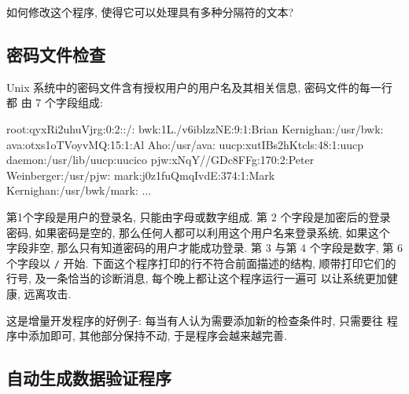 \begin{exercise}
    如何修改这个程序, 使得它可以处理具有多种分隔符的文本?
\end{exercise}

\subsection{密码文件检查}
\label{subsec:password_file checking}

Unix 系统中的密码文件含有授权用户的用户名及其相关信息, 密码文件的每一行都
由 7 个字段组成:
\begin{awkcode}
    root:qyxRi2uhuVjrg:0:2::/:
    bwk:1L./v6iblzzNE:9:1:Brian Kernighan:/usr/bwk:
    ava:otxs1oTVoyvMQ:15:1:Al Aho:/usr/ava:
    uucp:xutIBs2hKtcls:48:1:uucp daemon:/usr/lib/uucp:uucico
    pjw:xNqY//GDc8FFg:170:2:Peter Weinberger:/usr/pjw:
    mark:j0z1fuQmqIvdE:374:1:Mark Kernighan:/usr/bwk/mark:
    ...
\end{awkcode}
第1个字段是用户的登录名, 只能由字母或数字组成. 第 2 个字段是加密后的登录
密码, 如果密码是空的, 那么任何人都可以利用这个用户名来登录系统, 如果这个
字段非空, 那么只有知道密码的用户才能成功登录. 第 3 与第 4 个字段是数字,
第 6 个字段以 \verb'/' 开始. 下面这个程序打印的行不符合前面描述的结构,
顺带打印它们的行号, 及一条恰当的诊断消息, 每个晚上都让这个程序运行一遍可
以让系统更加健康, 远离攻击.

这是增量开发程序的好例子: 每当有人认为需要添加新的检查条件时, 只需要往
程序中添加即可, 其他部分保持不动, 于是程序会越来越完善.

\subsection{自动生成数据验证程序}
\label{subsec:generating_data_validation_programs}


